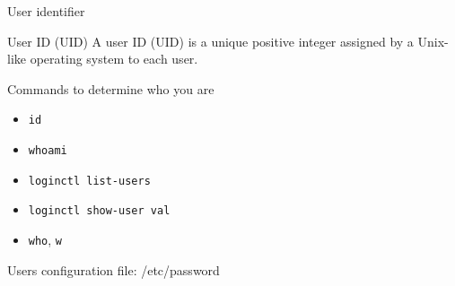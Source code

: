 \begin{frame}[fragile]{User identifier}

\begin{block}{User ID (UID)}
\alert{A user ID (UID)} is a unique positive integer assigned by a Unix-like operating system to each user.
\end{block}

Commands to determine who you are
  \begin{itemize}
    \item \verb|id|
    \item \verb|whoami|
    \item \verb|loginctl list-users|
    \item \verb|loginctl show-user val|
    \item \verb|who|, \verb|w|
  \end{itemize}
Users configuration file:  \alert{/etc/password}
\end{frame}
